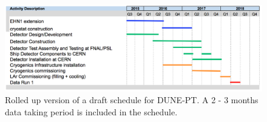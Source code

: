 \begin{figure}[htb]
  \centering
\includegraphics[scale=0.34]{figures/150529_CERNproto_schedule.png}
  \caption{Rolled up version of a draft schedule for DUNE-PT. A 2 - 3 months data taking period is included in the schedule. }
  \label{fig:schedule}
\end{figure}

%
%

